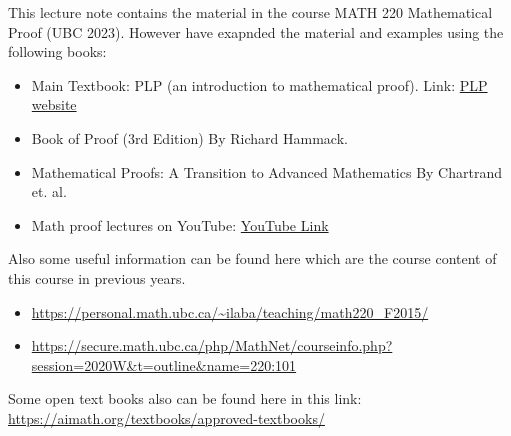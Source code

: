 \documentclass[10pt]{article}
\begin{document}

This lecture note contains the material in the course MATH 220 Mathematical Proof (UBC 2023). However have exapnded the material and examples using the following books:

\begin{itemize}
	\item Main Textbook: PLP (an introduction to mathematical proof). Link: \href{https://personal.math.ubc.ca/~PLP/}{PLP website}
	\item Book of Proof (3rd Edition) By Richard Hammack.
	\item Mathematical Proofs: A Transition to Advanced Mathematics By Chartrand et. al.
	\item Math proof lectures on YouTube: \href{https://www.youtube.com/watch?v=UuETUEJo0rk&list=PL2419488168AE7001&index=1}{YouTube Link} 
\end{itemize}



Also some useful information can be found here which are the course content of this course in previous years.
\begin{itemize}
	\item \url{https://personal.math.ubc.ca/~ilaba/teaching/math220_F2015/}
	\item \url{https://secure.math.ubc.ca/php/MathNet/courseinfo.php?session=2020W&t=outline&name=220:101}
\end{itemize}


Some open text books also can be found here in this link: \url{https://aimath.org/textbooks/approved-textbooks/}

\newpage

\newpage

\end{document}
